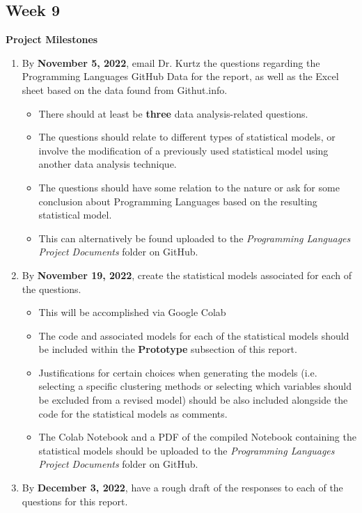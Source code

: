 \documentclass{article}
\theoremstyle{theorem}
\theoremstyle{definition}
\theoremstyle{remark}
\begin{document}
\subsection{Week 9}
\textbf{Project Milestones}
\begin{enumerate}
    \item By \textbf{November 5, 2022}, email Dr. Kurtz the questions regarding the Programming Languages GitHub Data for the report, as well as the Excel sheet based on the data found from Githut.info.
    \begin{itemize}
        \item There should at least be \textbf{three} data analysis-related questions.
        \item The questions should relate to different types of statistical models, or involve the modification of a previously used statistical model using another data analysis technique.
        \item The questions should have some relation to the nature or ask for some conclusion about Programming Languages based on the resulting statistical model.
        \item This can alternatively be found uploaded to the \textit{Programming Languages Project Documents} folder on GitHub.
    \end{itemize}
    \item By \textbf{November 19, 2022}, create the statistical models associated for each of the questions.
    \begin{itemize}
        \item This will be accomplished via Google Colab
        \item The code and associated models for each of the statistical models should be included within the \textbf{Prototype} subsection of this report.
        \item Justifications for certain choices when generating the models (i.e. selecting a specific clustering methods or selecting which variables should be excluded from a revised model) should be also included alongside the code for the statistical models as comments.
        \item The Colab Notebook and a PDF of the compiled Notebook containing the statistical models should be uploaded to the \textit{Programming Languages Project Documents} folder on GitHub.
    \end{itemize}
    \item By \textbf{December 3, 2022}, have a rough draft of the responses to each of the questions for this report.

\end{enumerate}
\end{document}
